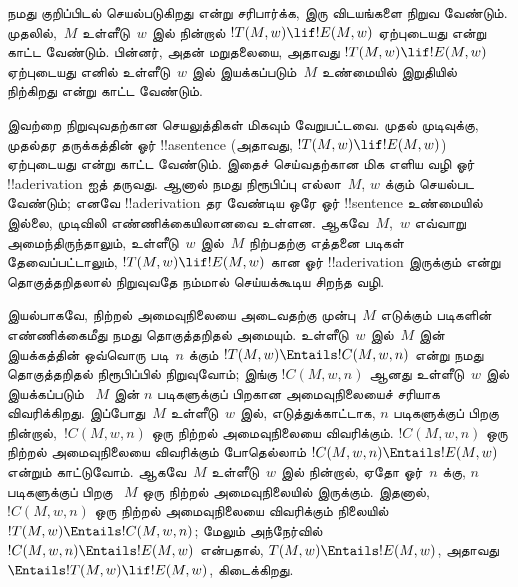 \documentclass[../../../include/open-logic-section]{subfiles}
\begin{document}


\begin{explain}
நமது குறிப்பிடல் செயல்படுகிறது என்று சரிபார்க்க, இரு விடயங்களை நிறுவ
வேண்டும். முதலில்,~$M$ உள்ளீடு~$w$ இல் நின்றால்
$!T(M, w) \lif !E(M, w)$ ஏற்புடையது என்று காட்ட வேண்டும். பின்னர்,
அதன் மறுதலையை, அதாவது $!T(M, w) \lif !E(M, w)$ ஏற்புடையது எனில்
உள்ளீடு~$w$ இல் இயக்கப்படும்~$M$ உண்மையில் இறுதியில் நிற்கிறது
என்று காட்ட வேண்டும்.

இவற்றை நிறுவுவதற்கான செயலுத்திகள் மிகவும் வேறுபட்டவை. முதல் முடிவுக்கு,
முதல்தர தருக்கத்தின் ஓர் !!a{sentence} (அதாவது,
$!T(M, w) \lif !E(M, w)$) ஏற்புடையது என்று காட்ட வேண்டும். இதைச்
செய்வதற்கான மிக எளிய வழி ஓர் !!a{derivation} ஐத் தருவது. ஆனால் நமது
நிரூபிப்பு எல்லா~$M$, $w$ க்கும் செயல்பட வேண்டும்; எனவே
!!a{derivation} தர வேண்டிய ஒரே ஓர் !!{sentence} உண்மையில் இல்லை,
முடிவிலி எண்ணிக்கையிலானவை உள்ளன. ஆகவே~$M$,~$w$ எவ்வாறு
அமைந்திருந்தாலும், உள்ளீடு~$w$ இல்~$M$ நிற்பதற்கு எத்தனை படிகள்
தேவைப்பட்டாலும், $!T(M, w) \lif !E(M, w)$ கான ஓர் !!a{derivation}
இருக்கும் என்று தொகுத்தறிதலால் நிறுவுவதே நம்மால் செய்யக்கூடிய
சிறந்த வழி.

இயல்பாகவே, நிற்றல் அமைவுநிலையை அடைவதற்கு முன்பு~$M$ எடுக்கும் படிகளின்
எண்ணிக்கைமீது நமது தொகுத்தறிதல் அமையும். உள்ளீடு~$w$ இல்~$M$ இன்
இயக்கத்தின் ஒவ்வொரு படி~$n$ க்கும்
$!T(M, w) \Entails !C(M, w, n)$ என்று நமது தொகுத்தறிதல் நிரூபிப்பில்
நிறுவுவோம்; இங்கு $!C(M, w, n)$ ஆனது உள்ளீடு~$w$ இல் இயக்கப்படும்
~$M$ இன் $n$ படிகளுக்குப் பிறகான அமைவுநிலையைச் சரியாக விவரிக்கிறது.
இப்போது~$M$ உள்ளீடு~$w$ இல், எடுத்துக்காட்டாக, $n$ படிகளுக்குப்
பிறகு நின்றால்,~$!C(M, w, n)$ ஒரு நிற்றல் அமைவுநிலையை விவரிக்கும்.
$!C(M, w, n)$ ஒரு நிற்றல் அமைவுநிலையை விவரிக்கும் போதெல்லாம்
$!C(M, w, n) \Entails !E(M, w)$ என்றும் காட்டுவோம். ஆகவே~$M$
உள்ளீடு~$w$ இல் நின்றால், ஏதோ ஓர்~$n$ க்கு, $n$ படிகளுக்குப் பிறகு
~$M$ ஒரு நிற்றல் அமைவுநிலையில் இருக்கும். இதனால், $!C(M, w, n)$
ஒரு நிற்றல் அமைவுநிலையை விவரிக்கும் நிலையில்
$!T(M, w) \Entails !C(M, w, n)$; மேலும் அந்நேர்வில்
$!C(M, w, n) \Entails !E(M, w)$ என்பதால்,
$T(M, w) \Entails !E(M, w)$, அதாவது
$\Entails !T(M, w) \lif !E(M, w)$, கிடைக்கிறது.


\end{explain}
\end{document}
